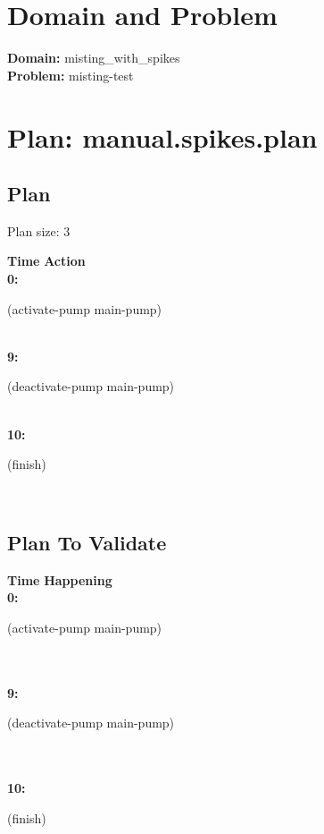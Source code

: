 \documentclass[a4paper,12pt]{article}
\author{\mbox{\sc {\sc Val}}}
\newcommand{\headingtimeaction}{{\bf Time} \qquad \= {\bf Action}\\[0.8ex]}
\newcommand{\headingtimehappening}{{\bf Time} \qquad \= {\bf Happening}\\[0.8ex]}
\newcommand{\atime}[1]{{\bf #1:}}
\newcommand{\action}[1]{{\sf #1}}
\newcommand{\listrow}[1]{\begin{minipage}[t]{11.5cm} #1 \end{minipage}}
\begin{document}
 \maketitle 
\section{Domain and Problem}
{\bf Domain:} misting\_with\_spikes\\
{\bf Problem:} misting-test
\section{\sloppy Plan: manual.spikes.plan}
\subsection{Plan}
Plan size: 3
\begin{tabbing}
\headingtimeaction 
\atime{0} \> \listrow{\action{(activate-pump main-pump)}}\\
\atime{9} \> \listrow{\action{(deactivate-pump main-pump)}}\\
\atime{10} \> \listrow{\action{(finish)}}\\
\end{tabbing}
\subsection{Plan To Validate}
\begin{tabbing}
\headingtimehappening 
\atime{0}  \> \listrow{\action{(activate-pump main-pump)}}\\
\\\atime{9}  \> \listrow{\action{(deactivate-pump main-pump)}}\\
\\\atime{10}  \> \listrow{\action{(finish)}}\\
\end{tabbing}
\end{document}
